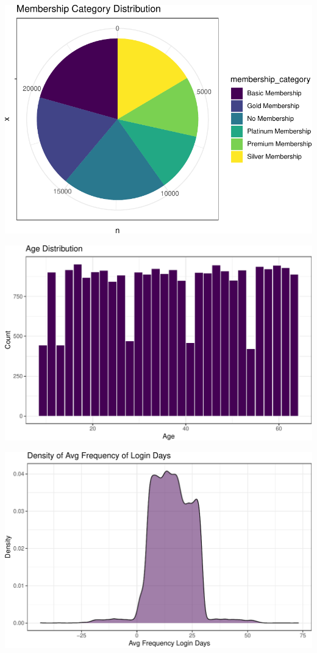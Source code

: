 \documentclass[
  letterpaper,
  DIV=11,
  numbers=noendperiod]{scrartcl}
\begin{document}
\begin{center}
\includegraphics{FPCP4_files/figure-pdf/unnamed-chunk-14-1.pdf}
\end{center}

\begin{center}
\includegraphics{FPCP4_files/figure-pdf/unnamed-chunk-15-1.pdf}
\end{center}

\begin{center}
\includegraphics{FPCP4_files/figure-pdf/unnamed-chunk-16-1.pdf}
\end{center}
\end{document}
